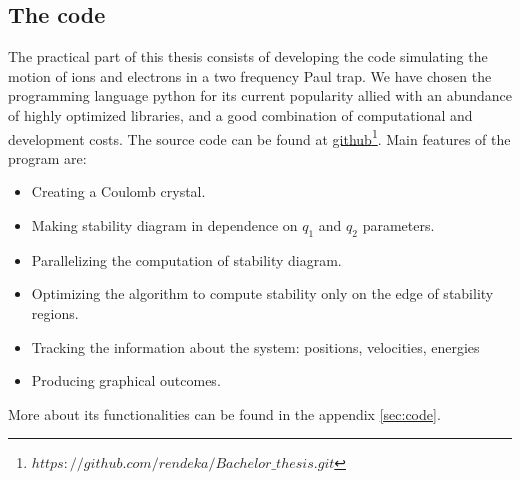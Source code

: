 \subsection{The code}
The practical part of this thesis consists of developing the code simulating the motion of ions and electrons in a two frequency Paul trap. We have chosen the programming language python for its current popularity allied with an abundance of highly optimized libraries, and a good combination of computational and development costs. The source code can be found at \href{https://github.com/rendeka/Bachelor_thesis.git}{github\footnote{\href{https://github.com/rendeka/Bachelor_thesis.git}{$https://github.com/rendeka/Bachelor\_thesis.git$}}.} Main features of the program are:
\begin{itemize}
	\item Creating a Coulomb crystal.
	\item Making stability diagram in dependence on $q_1$ and $q_2$ parameters.
	\item Parallelizing the computation of stability diagram. 
	\item Optimizing the algorithm to compute stability only on the edge of stability regions.
	\item Tracking the information about the system: positions, velocities, energies
	\item Producing graphical outcomes.
\end{itemize}
More about its functionalities can be found in the appendix \ref{sec:code}.